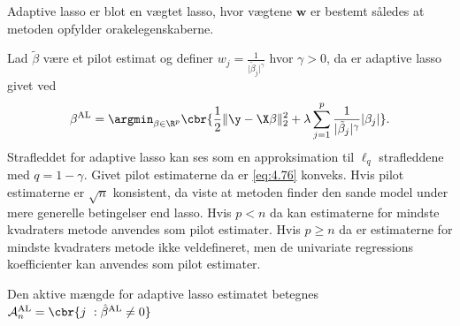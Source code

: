 Adaptive lasso er blot en vægtet lasso, hvor vægtene \(\mathbf{w}\) er bestemt således at metoden opfylder orakelegenskaberne.

Lad \(\tilde{\beta}\) være et pilot estimat og definer $w_j = \frac{1}{\vert \tilde{\beta}_j \vert^\gamma}$ hvor \(\gamma>0\), da er adaptive lasso givet ved
\begin{align}
\beta^\text{AL} = \argmin_{\beta \in \R^p} \cbr{\frac{1}{2} \Vert \y - \X \beta \Vert_2^2 + \lambda \sum_{j=1}^p \frac{1}{\vert \tilde{\beta}_j \vert^\gamma} \vert \beta_j \vert}. \label{eq:4.76}
\end{align}
Strafleddet for adaptive lasso kan ses som en approksimation til $\ell_q$ strafleddene med $q=1-\gamma$.
Givet pilot estimaterne da er \eqref{eq:4.76} konveks.
Hvis pilot estimaterne er \(\sqrt{n}\) konsistent, da viste \citep{adaptive_lasso} at metoden finder den sande model under mere generelle betingelser end lasso.
Hvis \(p <n\) da kan estimaterne for mindste kvadraters metode anvendes som pilot estimater. Hvis \(p \geq n\) da er estimaterne for mindste kvadraters metode ikke veldefineret, men de univariate regressions koefficienter kan anvendes som pilot estimater.

Den aktive mængde for adaptive lasso estimatet betegnes \(\mathcal{A}_n^\text{AL} = \cbr{j \ : \hat{\beta}^{\text{AL}} \neq 0 }\)

